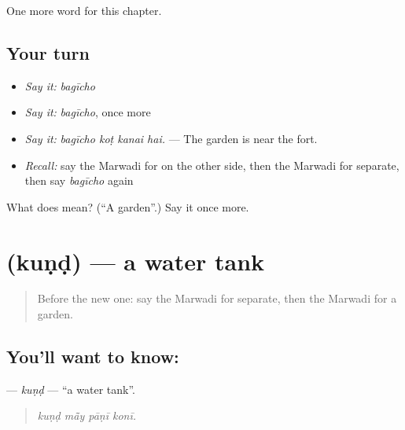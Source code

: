\begin{grammarlens}[title={What you've built}]
One more word for this chapter.
\end{grammarlens}

\subsection*{Your turn}
\begin{itemize}
\raggedright
  \item \emph{Say it:} \emph{bagīcho}
  \item \emph{Say it:} \emph{bagīcho}, once more
  \item \emph{Say it:} \emph{bagīcho koṭ kanai hai.} — The garden is near the fort.
  \item \emph{Recall:} say the Marwadi for on the other side, then the Marwadi for separate, then say \emph{bagīcho} again
\end{itemize}

\begin{tcolorbox}[breakable,colback=teal!4,colframe=teal!35!black,title={Before you move on}]
What does  mean? (\textquotedblleft{}A garden\textquotedblright{}.) Say it once more.
\end{tcolorbox}
\section[\texorpdfstring{\mw{कुंड} (kuṇḍ)}{कुंड (kuṇḍ)}]{ (kuṇḍ) — a water tank}

\label{lesson:MW-C207-kund}



\begin{quote}
Before the new one: say the Marwadi for separate, then the Marwadi for a garden.
\end{quote}

\subsection*{You'll want to know: }
\textbf{} — \emph{kuṇḍ} — \textquotedblleft{}a water tank\textquotedblright{}.

\begin{quote}
   
\end{quote}

\begin{quote}
\emph{kuṇḍ mā̃y pāṇī konī.}
\end{quote}

